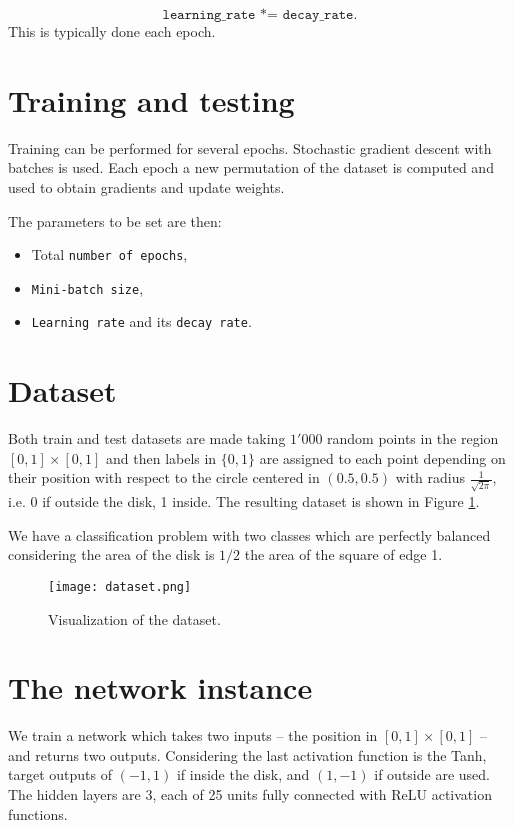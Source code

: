 \documentclass[11pt,conference,compsocconf]{IEEEtran}
\begin{document}
\begin{equation*}
    \texttt{learning\_rate *= decay\_rate}.
\end{equation*}
This is typically done each epoch.


\section{Training and testing}

Training can be performed for several epochs. Stochastic gradient descent with batches is used. Each epoch a new permutation of the dataset is computed and used to obtain gradients and update weights. 

The parameters to be set are then:
\begin{itemize}
    \item Total \texttt{number of epochs},
    \item \texttt{Mini-batch size},
    \item \texttt{Learning rate} and its \texttt{decay rate}.
\end{itemize}




\section{Dataset}

Both train and test datasets are made taking $1'000$ random points in the region $[0,1]\times[0,1]$ and then labels in $\{0,1\}$ are assigned to each point depending on their position with respect to the circle centered in $(0.5, 0.5)$ with radius $\frac{1}{\sqrt{2\pi}}$, i.e. 0 if outside the disk, 1 inside. The resulting dataset is shown in Figure \ref{fig:dataset}.

We have a classification problem with two classes which are perfectly balanced considering the area of the disk is $1/2$ the area of the square of edge 1.

\begin{figure}
    \centering
    \texttt{[image: dataset.png]}
    \caption{Visualization of the dataset.}
    \label{fig:dataset}
\end{figure}

\section{The network instance}

We train a network which takes two inputs -- the position in $[0,1]\times[0,1]$ -- and returns two outputs. Considering the last activation function is the Tanh, target outputs of $(-1, 1)$ if inside the disk, and $(1, -1)$ if outside are used. The hidden layers are 3, each of 25 units fully connected with ReLU activation functions. 
\end{document}
